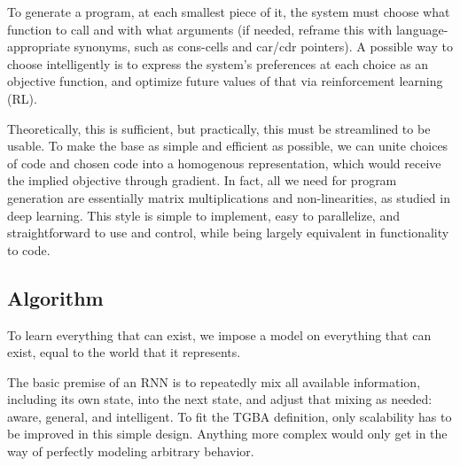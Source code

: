 \documentclass{article}
\begin{document}
\begin{itemize}
To generate a program, at each smallest piece of it, the system must choose what function to call and with what arguments (if needed, reframe this with language-appropriate synonyms, such as cons-cells and car/cdr pointers). A possible way to choose intelligently is to express the system's preferences at each choice as an objective function, and optimize future values of that via reinforcement learning (RL).

Theoretically, this is sufficient, but practically, this must be streamlined to be usable. To make the base as simple and efficient as possible, we can unite choices of code and chosen code into a homogenous representation, which would receive the implied objective through gradient. In fact, all we need for program generation are essentially matrix multiplications and non-linearities, as studied in deep learning. This style is simple to implement, easy to parallelize, and straightforward to use and control, while being largely equivalent in functionality to code.
\end{itemize}

\subsection{Algorithm\label{Algorithm}}

To learn everything that can exist, we impose a model on everything that can exist, equal to the world that it represents.

The basic premise of an RNN is to repeatedly mix all available information, including its own state, into the next state, and adjust that mixing as needed: aware, general, and intelligent. To fit the TGBA definition, only scalability has to be improved in this simple design. Anything more complex would only get in the way of perfectly modeling arbitrary behavior.
\end{document}
